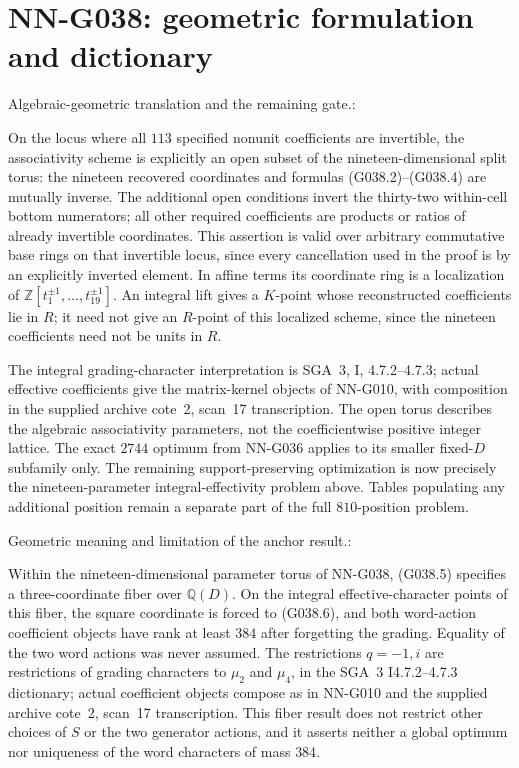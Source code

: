 \section{NN-G038: geometric formulation and dictionary}
\begin{geometricstatement}[NN-G038]
Algebraic-geometric translation and the remaining gate.:

On the locus where all $113$ specified nonunit coefficients
are invertible, the associativity scheme is explicitly an
open subset of the nineteen-dimensional split torus:
the nineteen recovered coordinates and formulas
(G038.2)--(G038.4) are mutually inverse.
The additional open conditions invert the thirty-two
within-cell bottom numerators; all other required
coefficients are products or ratios of already invertible
coordinates.
This assertion is valid over arbitrary commutative base
rings on that invertible locus, since every cancellation
used in the proof is by an explicitly inverted element.
In affine terms its coordinate ring is a localization of
$\mathbb Z[t_1^{\pm1},\ldots,t_{19}^{\pm1}]$.
An integral lift gives a $K$-point whose reconstructed
coefficients lie in $R$; it need not give an $R$-point
of this localized scheme, since the nineteen coefficients
need not be units in $R$.

The integral grading-character interpretation is SGA~3,
I, 4.7.2--4.7.3; actual effective coefficients give the
matrix-kernel objects of NN-G010, with composition in
the supplied archive cote~2, scan~17 transcription.
The open torus describes the algebraic associativity
parameters, not the coefficientwise positive integer
lattice. The exact $2744$ optimum from NN-G036 applies
to its smaller fixed-$D$ subfamily only.
The remaining support-preserving optimization is now
precisely the nineteen-parameter integral-effectivity
problem above. Tables populating any additional position
remain a separate part of the full $810$-position problem.


Geometric meaning and limitation of the anchor result.:

Within the nineteen-dimensional parameter torus of NN-G038,
(G038.5) specifies a three-coordinate fiber over $\mathbb Q(D)$.
On the integral effective-character points of this fiber,
the square coordinate is forced to (G038.6), and both word-action
coefficient objects have rank at least $384$ after forgetting
the grading. Equality of the two word actions was never assumed.
The restrictions $q=-1,i$ are restrictions of grading characters
to $\mu_2$ and $\mu_4$, in the SGA~3 I4.7.2--4.7.3 dictionary;
actual coefficient objects compose as in NN-G010 and the supplied
archive cote~2, scan~17 transcription. This fiber result does not
restrict other choices of $S$ or the two generator actions, and
it asserts neither a global optimum nor uniqueness of the word
characters of mass $384$.



\end{geometricstatement}
